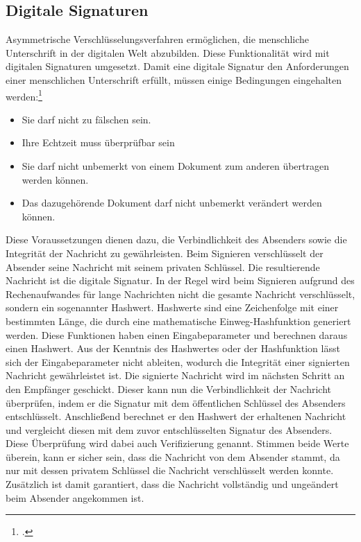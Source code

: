 \documentclass  [paper=a4,
				fontsize=12pt,
				listof=totoc,
				bibliography=totoc
				]{scrreprt}
\begin{document}
			\subsection{Digitale Signaturen}\label{chp: Signatur}	
				Asymmetrische Verschlüsselungsverfahren ermöglichen, die menschliche Unterschrift in der digitalen Welt abzubilden. Diese Funktionalität wird mit digitalen Signaturen umgesetzt. Damit eine digitale Signatur den Anforderungen einer menschlichen Unterschrift erfüllt, müssen einige Bedingungen eingehalten werden:\footcite[S. 202]{Schmeh2013}
				\begin{itemize}
					\item Sie darf nicht zu fälschen sein.
					\item Ihre Echtzeit muss überprüfbar sein
					\item Sie darf nicht unbemerkt von einem Dokument zum anderen übertragen werden können.
					\item Das dazugehörende Dokument darf nicht unbemerkt verändert werden können.
				\end{itemize}
				Diese Voraussetzungen dienen dazu, die Verbindlichkeit des Absenders sowie die Integrität der Nachricht zu gewährleisten. Beim Signieren verschlüsselt der Absender seine Nachricht mit seinem privaten Schlüssel. Die resultierende Nachricht ist die digitale Signatur. In der Regel wird	beim Signieren aufgrund des Rechenaufwandes für lange Nachrichten nicht die gesamte Nachricht verschlüsselt, sondern ein sogenannter Hashwert. Hashwerte sind eine Zeichenfolge mit einer bestimmten Länge, die durch eine mathematische Einweg-Hashfunktion generiert werden. Diese Funktionen haben einen Eingabeparameter und berechnen daraus einen Hashwert. Aus der Kenntnis des Hashwertes oder der Hashfunktion lässt sich der Eingabeparameter nicht ableiten, wodurch die Integrität einer signierten Nachricht gewährleistet ist.
				Die signierte Nachricht wird im nächsten Schritt an den Empfänger geschickt. Dieser kann nun die Verbindlichkeit der Nachricht überprüfen, indem er die Signatur mit dem öffentlichen Schlüssel des Absenders entschlüsselt. Anschließend berechnet er den Hashwert der erhaltenen Nachricht und vergleicht diesen mit dem zuvor entschlüsselten Signatur des Absenders. Diese Überprüfung wird dabei auch Verifizierung genannt. Stimmen beide Werte überein, kann er sicher sein, dass die Nachricht von dem Absender stammt, da nur mit dessen privatem Schlüssel die Nachricht verschlüsselt werden konnte. Zusätzlich ist damit garantiert, dass die Nachricht vollständig und ungeändert beim Absender angekommen ist.
				
\end{document}
